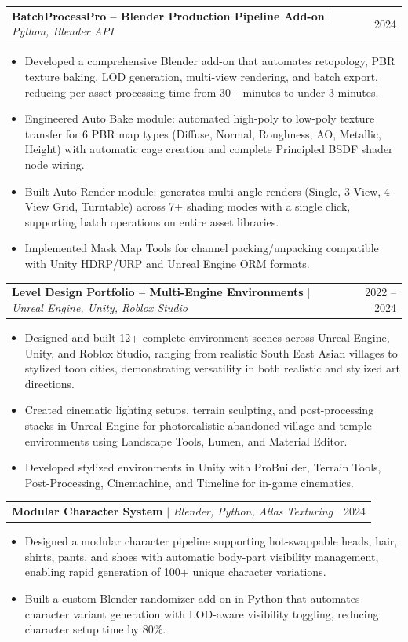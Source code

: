 \documentclass[letterpaper,11pt]{article}
\makeatletter
\newcommand{\resumeItem}[1]{
  \item\small{
    {#1 \vspace{-2pt}}
  }
}
\newcommand{\resumeProjectHeading}[2]{
    \item
    \begin{tabular*}{0.97\textwidth}{l@{\extracolsep{\fill}}r}
      \small#1 & #2 \\
    \end{tabular*}\vspace{-7pt}
}
\newcommand{\resumeItemListStart}{\begin{itemize}}
\newcommand{\resumeItemListEnd}{\end{itemize}\vspace{-5pt}}
\makeatother
\begin{document}
      \resumeProjectHeading
          {\textbf{BatchProcessPro -- Blender Production Pipeline Add-on} $|$ \emph{Python, Blender API}}{2024}
          \resumeItemListStart
            \resumeItem{Developed a comprehensive Blender add-on that automates retopology, PBR texture baking, LOD generation, multi-view rendering, and batch export, reducing per-asset processing time from 30+ minutes to under 3 minutes.}
            \resumeItem{Engineered Auto Bake module: automated high-poly to low-poly texture transfer for 6 PBR map types (Diffuse, Normal, Roughness, AO, Metallic, Height) with automatic cage creation and complete Principled BSDF shader node wiring.}
            \resumeItem{Built Auto Render module: generates multi-angle renders (Single, 3-View, 4-View Grid, Turntable) across 7+ shading modes with a single click, supporting batch operations on entire asset libraries.}
            \resumeItem{Implemented Mask Map Tools for channel packing/unpacking compatible with Unity HDRP/URP and Unreal Engine ORM formats.}
          \resumeItemListEnd

      \resumeProjectHeading
          {\textbf{Level Design Portfolio -- Multi-Engine Environments} $|$ \emph{Unreal Engine, Unity, Roblox Studio}}{2022 -- 2024}
          \resumeItemListStart
            \resumeItem{Designed and built 12+ complete environment scenes across Unreal Engine, Unity, and Roblox Studio, ranging from realistic South East Asian villages to stylized toon cities, demonstrating versatility in both realistic and stylized art directions.}
            \resumeItem{Created cinematic lighting setups, terrain sculpting, and post-processing stacks in Unreal Engine for photorealistic abandoned village and temple environments using Landscape Tools, Lumen, and Material Editor.}
            \resumeItem{Developed stylized environments in Unity with ProBuilder, Terrain Tools, Post-Processing, Cinemachine, and Timeline for in-game cinematics.}
          \resumeItemListEnd

      \resumeProjectHeading
          {\textbf{Modular Character System} $|$ \emph{Blender, Python, Atlas Texturing}}{2024}
          \resumeItemListStart
            \resumeItem{Designed a modular character pipeline supporting hot-swappable heads, hair, shirts, pants, and shoes with automatic body-part visibility management, enabling rapid generation of 100+ unique character variations.}
            \resumeItem{Built a custom Blender randomizer add-on in Python that automates character variant generation with LOD-aware visibility toggling, reducing character setup time by 80\%.}
          \resumeItemListEnd
\end{document}
